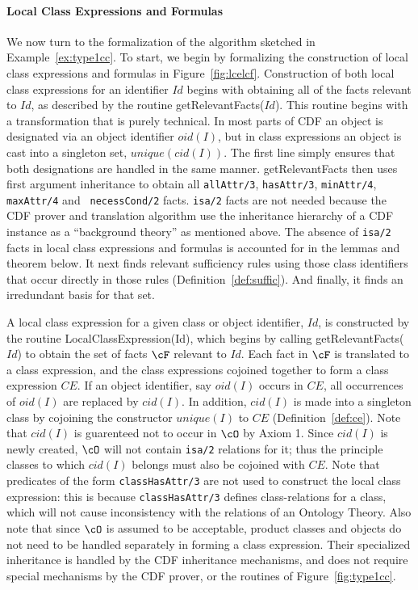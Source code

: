 \paragraph*{Local Class Expressions and Formulas}
We now turn to the formalization of the algorithm sketched in
Example~\ref{ex:type1cc}.  To start, we begin by formalizing the
construction of local class expressions and formulas in
Figure~\ref{fig:lcelcf}.  Construction of both local class expressions
for an identifier $Id$ begins with obtaining all of the facts relevant
to $Id$, as described by the routine {\sf getRelevantFacts($Id$)}.
This routine begins with a transformation that is purely technical.
In most parts of CDF an object is designated via an object identifier
$oid(I)$, but in class expressions an object is cast into a singleton
set, $unique(cid(I))$.  The first line simply ensures that both
designations are handled in the same manner.  {\sf getRelevantFacts}
then uses first argument inheritance to obtain all {\tt allAttr/3},
{\tt hasAttr/3}, {\tt minAttr/4}, {\tt maxAttr/4} and {\tt
necessCond/2} facts.  {\tt isa/2} facts are not needed because the CDF
prover and translation algorithm use the inheritance hierarchy of a
CDF instance as a ``background theory'' as mentioned above.  The
absence of {\tt isa/2} facts in local class expressions and formulas
is accounted for in the lemmas and theorem below. It next finds
relevant sufficiency rules using those class identifiers that occur
directly in those rules (Definition~\ref{def:suffic}).  And finally,
it finds an irredundant basis for that set.

A local class expression for a given class or object identifier, $Id$,
is constructed by the routine {\sf LocalClassExpression(Id)}, which
begins by calling {\sf getRelevantFacts($Id$)} to obtain the set of
facts $\cF$ relevant to $Id$.  Each fact in $\cF$ is translated to a
class expression, and the class expressions cojoined together to form
a class expression $CE$.  If an object identifier, say $oid(I)$ occurs
in $CE$, all occurrences of $oid(I)$ are replaced by $cid(I)$.  In
addition, $cid(I)$ is made into a singleton class by cojoining the
constructor $unique(I)$ to $CE$ (Definition~\ref{def:ce}).  Note that
$cid(I)$ is guarenteed not to occur in $\cO$ by Axiom 1.  Since
$cid(I)$ is newly created, $\cO$ will not contain {\tt isa/2}
relations for it; thus the principle classes to which $cid(I)$ belongs
must also be cojoined with $CE$.  Note that predicates of the form
{\tt classHasAttr/3} are not used to construct the local class
expression: this is because {\tt classHasAttr/3} defines
class-relations for a class, which will not cause inconsistency with
the relations of an Ontology Theory.  Also note that since $\cO$ is
assumed to be acceptable, product classes and objects do not need to
be handled separately in forming a class expression.  Their
specialized inheritance is handled by the CDF inheritance mechanisms,
and does not require special mechanisms by the CDF prover, or the
routines of Figure~\ref{fig:type1cc}.

